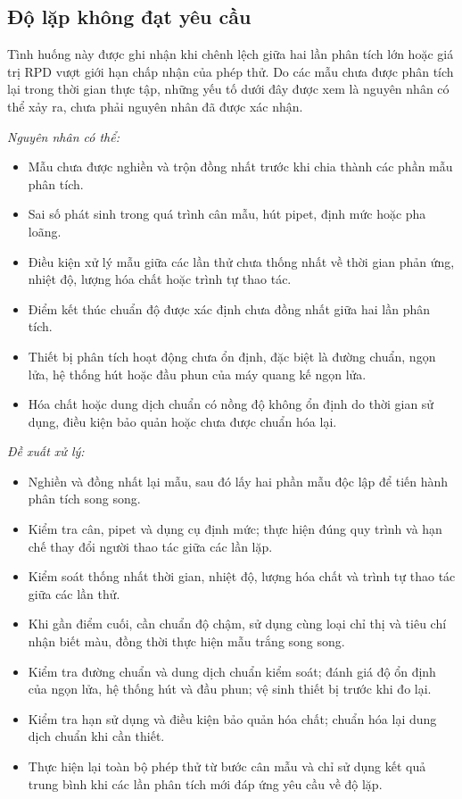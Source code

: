 \subsection{Độ lặp không đạt yêu cầu}
Tình huống này được ghi nhận khi chênh lệch giữa hai lần phân tích lớn hoặc giá trị RPD vượt giới hạn chấp nhận của phép thử. Do các mẫu chưa được phân tích lại trong thời gian thực tập, những yếu tố dưới đây được xem là nguyên nhân có thể xảy ra, chưa phải nguyên nhân đã được xác nhận.

\noindent\textit{Nguyên nhân có thể:}
\begin{itemize}
  \item Mẫu chưa được nghiền và trộn đồng nhất trước khi chia thành các phần mẫu phân tích.
  \item Sai số phát sinh trong quá trình cân mẫu, hút pipet, định mức hoặc pha loãng.
  \item Điều kiện xử lý mẫu giữa các lần thử chưa thống nhất về thời gian phản ứng, nhiệt độ, lượng hóa chất hoặc trình tự thao tác.
  \item Điểm kết thúc chuẩn độ được xác định chưa đồng nhất giữa hai lần phân tích.
  \item Thiết bị phân tích hoạt động chưa ổn định, đặc biệt là đường chuẩn, ngọn lửa, hệ thống hút hoặc đầu phun của máy quang kế ngọn lửa.
  \item Hóa chất hoặc dung dịch chuẩn có nồng độ không ổn định do thời gian sử dụng, điều kiện bảo quản hoặc chưa được chuẩn hóa lại.
\end{itemize}

\noindent\textit{Đề xuất xử lý:}
\begin{itemize}
  \item Nghiền và đồng nhất lại mẫu, sau đó lấy hai phần mẫu độc lập để tiến hành phân tích song song.
  \item Kiểm tra cân, pipet và dụng cụ định mức; thực hiện đúng quy trình và hạn chế thay đổi người thao tác giữa các lần lặp.
  \item Kiểm soát thống nhất thời gian, nhiệt độ, lượng hóa chất và trình tự thao tác giữa các lần thử.
  \item Khi gần điểm cuối, cần chuẩn độ chậm, sử dụng cùng loại chỉ thị và tiêu chí nhận biết màu, đồng thời thực hiện mẫu trắng song song.
  \item Kiểm tra đường chuẩn và dung dịch chuẩn kiểm soát; đánh giá độ ổn định của ngọn lửa, hệ thống hút và đầu phun; vệ sinh thiết bị trước khi đo lại.
  \item Kiểm tra hạn sử dụng và điều kiện bảo quản hóa chất; chuẩn hóa lại dung dịch chuẩn khi cần thiết.
  \item Thực hiện lại toàn bộ phép thử từ bước cân mẫu và chỉ sử dụng kết quả trung bình khi các lần phân tích mới đáp ứng yêu cầu về độ lặp.
\end{itemize}

